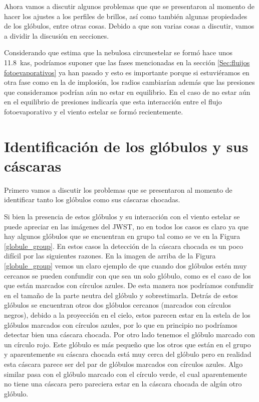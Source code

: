 \documentclass{book}
\begin{document}
Ahora vamos a discutir algunos problemas que que se presentaron al momento de hacer los ajustes a los perfiles de brillos, así como también algunas propiedades de los glóbulos, entre otras cosas. Debido a que son varias cosas a discutir, vamos a dividir la discusión en secciones.

Considerando que \cite{Zavala:2022} estima que la nebulosa circunestelar se formó hace unos \SI{11.8}{kas}, podríamos suponer que las fases mencionadas en la sección \ref{Sec:fluijos fotoevaporativos} ya han pasado y esto es importante porque si estuviéramos en otra fase como en la de implosión, los radios cambiarían además que las presiones que consideramos podrían aún no estar en equilibrio. En el caso de no estar aún en el equilibrio de presiones indicaría que esta interacción entre el flujo fotoevaporativo y el viento estelar se formó recientemente.\\

\section{Identificación de los glóbulos y sus cáscaras}\label{dis:casaras}

Primero vamos a discutir los problemas que se presentaron al momento de identificar tanto los glóbulos como sus cáscaras chocadas.

Si bien la presencia de estos glóbulos y su interacción con el viento estelar se puede apreciar en las imágenes del JWST, no en todos los casos es claro ya que hay algunos glóbulos que se encuentran en grupo tal como se ve en la Figura \ref{globule_group}. En estos casos la detección de la cáscara chocada es un poco difícil por las siguientes razones. En la imagen de arriba de la Figura \ref{globule_group} vemos un claro ejemplo de que cuando dos glóbulos estén muy cercanos se pueden confundir con que sea un solo glóbulo, como es el caso de los que están marcados con círculos azules. De esta manera nos podríamos confundir en el tamaño de la parte neutra del glóbulo y sobrestimarla. Detrás de estos glóbulos se encuentran otros dos glóbulos cercanos (marcados con círculos negros), debido a la proyección en el cielo, estos parecen estar en la estela de los glóbulos marcados con círculos azules, por lo que en principio no podríamos detectar bien una cáscara chocada. Por otro lado tenemos el glóbulo marcado con un círculo rojo. Este glóbulo es más pequeño que los otros que están en el grupo y aparentemente su cáscara chocada está muy cerca del glóbulo pero en realidad esta cáscara parece ser del par de glóbulos marcados con círculos azules. Algo similar pasa con el glóbulo marcado con el círculo verde, el cual aparentemente no tiene una cáscara pero pareciera estar en la cáscara chocada de algún otro glóbulo.
\end{document}
